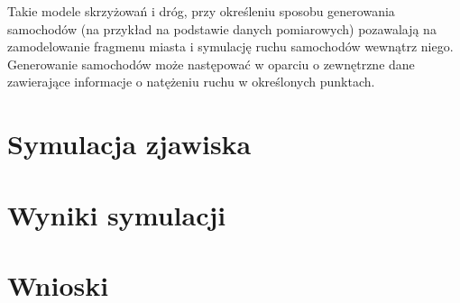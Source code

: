 \documentclass[a4paper,12pt]{article}
\begin{document}
Takie modele skrzyżowań i dróg, przy określeniu sposobu generowania samochodów (na przykład na podstawie danych pomiarowych) pozawalają na zamodelowanie fragmenu miasta i symulację ruchu samochodów wewnątrz niego. Generowanie samochodów może następować w oparciu o zewnętrzne dane zawierające informacje o natężeniu ruchu w określonych punktach. 




\section{Symulacja zjawiska}

	
\section{Wyniki symulacji}


\section{Wnioski}

	
	

\newpage




\end{document}
